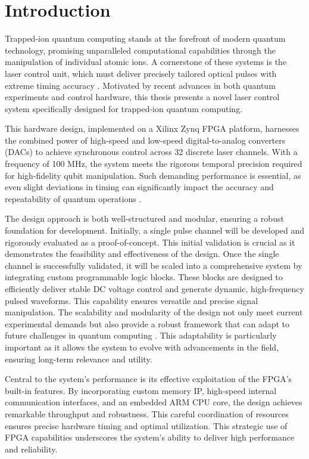 \chapter{Introduction}

Trapped-ion quantum computing stands at the forefront of modern quantum technology, promising unparalleled computational capabilities through the manipulation of individual atomic ions. A cornerstone of these systems is the laser control unit, which must deliver precisely tailored optical pulses with extreme timing accuracy \cite{manychanfpgactrlsys}. Motivated by recent advances in both quantum experiments and control hardware, this thesis presents a novel laser control system specifically designed for trapped-ion quantum computing.

This hardware design, implemented on a Xilinx Zynq FPGA platform, harnesses the combined power of high-speed and low-speed digital-to-analog converters (DACs) to achieve synchronous control across 32 discrete laser channels. With a frequency of 100 MHz, the system meets the rigorous temporal precision required for high-fidelity qubit manipulation. Such demanding performance is essential, as even slight deviations in timing can significantly impact the accuracy and repeatability of quantum operations \cite{manychanfpgactrlsys}.

The design approach is both well-structured and modular, ensuring a robust foundation for development. Initially, a single pulse channel will be developed and rigorously evaluated as a proof-of-concept. This initial validation is crucial as it demonstrates the feasibility and effectiveness of the design. Once the single channel is successfully validated, it will be scaled into a comprehensive system by integrating custom programmable logic blocks. These blocks are designed to efficiently deliver stable DC voltage control and generate dynamic, high-frequency pulsed waveforms. This capability ensures versatile and precise signal manipulation. The scalability and modularity of the design not only meet current experimental demands but also provide a robust framework that can adapt to future challenges in quantum computing \cite{programmablesoc4ctrlexperiment}. This adaptability is particularly important as it allows the system to evolve with advancements in the field, ensuring long-term relevance and utility.

Central to the system's performance is its effective exploitation of the FPGA's built-in features. By incorporating custom memory IP, high-speed internal communication interfaces, and an embedded ARM CPU core, the design achieves remarkable throughput and robustness. This careful coordination of resources ensures precise hardware timing and optimal utilization. This strategic use of FPGA capabilities underscores the system's ability to deliver high performance and reliability.